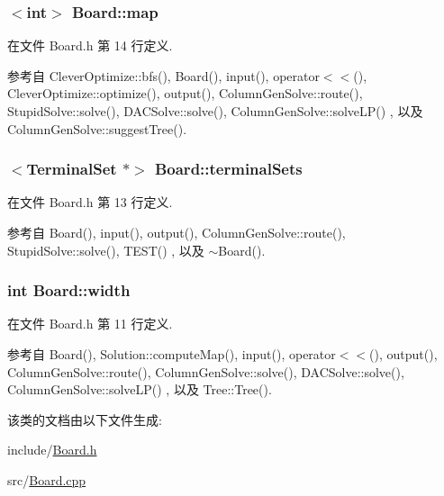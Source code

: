\subsubsection[{\texorpdfstring{map}{map}}]{$<$int$>$ Board\+::map}\hypertarget{classBoard_a191ff45df9151b8fee0c32877f582165}{}\label{classBoard_a191ff45df9151b8fee0c32877f582165}


在文件 Board.\+h 第 14 行定义.



参考自 Clever\+Optimize\+::bfs(), Board(), input(), operator$<$$<$(), Clever\+Optimize\+::optimize(), output(), Column\+Gen\+Solve\+::route(), Stupid\+Solve\+::solve(), D\+A\+C\+Solve\+::solve(), Column\+Gen\+Solve\+::solve\+L\+P() , 以及 Column\+Gen\+Solve\+::suggest\+Tree().

\subsubsection[{\texorpdfstring{terminal\+Sets}{terminalSets}}]{$<${\bf Terminal\+Set} $\ast$$>$ Board\+::terminal\+Sets}\hypertarget{classBoard_a6683a9c042af7113f55c5bc1b9656b69}{}\label{classBoard_a6683a9c042af7113f55c5bc1b9656b69}


在文件 Board.\+h 第 13 行定义.



参考自 Board(), input(), output(), Column\+Gen\+Solve\+::route(), Stupid\+Solve\+::solve(), T\+E\+S\+T() , 以及 $\sim$\+Board().

\subsubsection[{\texorpdfstring{width}{width}}]{\setlength{\rightskip}{0pt plus 5cm}int Board\+::width}\hypertarget{classBoard_a90a8efaa4736af25511ac948bdd27d6c}{}\label{classBoard_a90a8efaa4736af25511ac948bdd27d6c}


在文件 Board.\+h 第 11 行定义.



参考自 Board(), Solution\+::compute\+Map(), input(), operator$<$$<$(), output(), Column\+Gen\+Solve\+::route(), Column\+Gen\+Solve\+::solve(), D\+A\+C\+Solve\+::solve(), Column\+Gen\+Solve\+::solve\+L\+P() , 以及 Tree\+::\+Tree().



该类的文档由以下文件生成\+:\begin{DoxyCompactItemize}
\item 
include/\hyperlink{Board_8h}{Board.\+h}\item 
src/\hyperlink{Board_8cpp}{Board.\+cpp}\end{DoxyCompactItemize}
